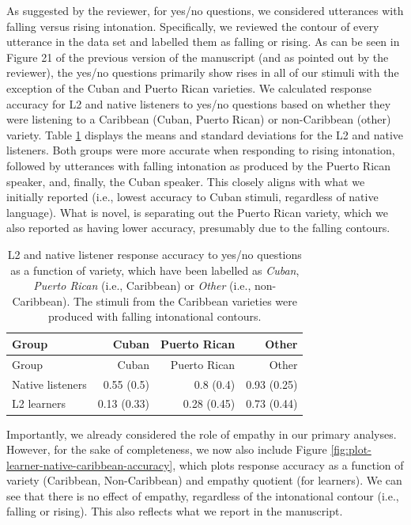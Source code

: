 \documentclass[]{article}
\begin{document}
As suggested by the reviewer, for yes/no questions, we considered utterances with falling versus rising intonation.
Specifically, we reviewed the contour of every utterance in the data set and labelled them as falling or rising.
As can be seen in Figure 21 of the previous version of the manuscript (and as pointed out by the reviewer), the yes/no questions primarily show rises in all of our stimuli with the exception of the Cuban and Puerto Rican varieties.
We calculated response accuracy for L2 and native listeners to yes/no questions based on whether they were listening to a Caribbean (Cuban, Puerto Rican) or non-Caribbean (other) variety.
Table \ref{tab:table-learner-native-caribbean} displays the means and standard deviations for the L2 and native listeners.
Both groups were more accurate when responding to rising intonation, followed by utterances with falling intonation as produced by the Puerto Rican speaker, and, finally, the Cuban speaker.
This closely aligns with what we initially reported (i.e., lowest accuracy to Cuban stimuli, regardless of native language).
What is novel, is separating out the Puerto Rican variety, which we also reported as having lower accuracy, presumably due to the falling contours.

\begin{longtable}[]{@{}lrrr@{}}
\caption{\label{tab:table-learner-native-caribbean}L2 and native listener response accuracy to yes/no questions as a function of variety, which have been labelled as \emph{Cuban}, \emph{Puerto Rican} (i.e., Caribbean) or \emph{Other} (i.e., non-Caribbean). The stimuli from the Caribbean varieties were produced with falling intonational contours.}\tabularnewline
\toprule()
Group & Cuban & Puerto Rican & Other \\
\midrule()
\endfirsthead
\toprule()
Group & Cuban & Puerto Rican & Other \\
\midrule()
\endhead
Native listeners & 0.55 (0.5) & 0.8 (0.4) & 0.93 (0.25) \\
L2 learners & 0.13 (0.33) & 0.28 (0.45) & 0.73 (0.44) \\
\bottomrule()
\end{longtable}

Importantly, we already considered the role of empathy in our primary analyses.
However, for the sake of completeness, we now also include Figure \ref{fig:plot-learner-native-caribbean-accuracy}, which plots response accuracy as a function of variety (Caribbean, Non-Caribbean) and empathy quotient (for learners).
We can see that there is no effect of empathy, regardless of the intonational contour (i.e., falling or rising).
This also reflects what we report in the manuscript.
\end{document}

